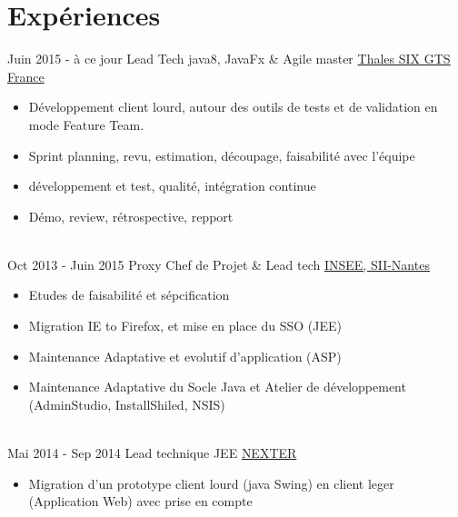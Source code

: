 \documentclass[letterpaper]{twentysecondcv} %
\begin{document}
\makeprofile %


\section{Expériences}

\begin{twenty} %
\twentyitem
    	{Juin 2015 -}
		{à ce jour}
        {Lead Tech java8, JavaFx \& Agile master}
        {\href{https://www.thalesgroup.com/fr}{Thales SIX GTS France}}
        {}
        {\begin{itemize} 		
      	\item Développement client lourd, autour des outils de tests et de validation en mode Feature Team.
        \item Sprint planning, revu, estimation, découpage, faisabilité avec l’équipe
        \item développement et test, qualité, intégration continue
        \item Démo, review, rétrospective, repport
        \end{itemize}}
        \\
	\twentyitem
    	{Oct 2013 -}
		{Juin 2015}
        {Proxy Chef de Projet \& Lead tech}
        {\href{https://www.insee.fr/fr/accueil}{INSEE, SII-Nantes}}
        {}
        {
        {\begin{itemize}
		\item Etudes de faisabilité et sépcification 
		\item Migration IE to Firefox, et mise en place du SSO (JEE)
		\item Maintenance Adaptative et evolutif d'application (ASP)
		\item Maintenance Adaptative du Socle Java et Atelier de développement (AdminStudio, InstallShiled, NSIS)
    	\end{itemize}}
        }
    \\   
    \twentyitem
   		{Mai 2014 -}
		{Sep 2014}
        {Lead technique JEE}
        {\href{https://www.nexter-group.fr/}{NEXTER}}
        {}
        {
        {\begin{itemize}
     		\item Migration d'un prototype client lourd (java Swing) en client leger (Application Web) avec prise en compte

\end{itemize}}}
\end{twenty}
\end{document}
